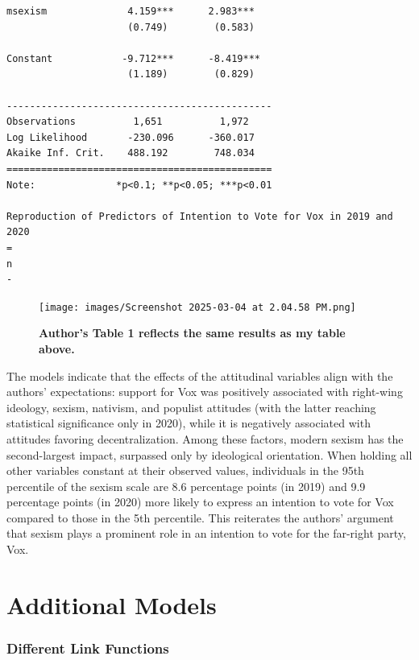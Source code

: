 \documentclass[
  letterpaper,
  DIV=11,
  numbers=noendperiod]{scrartcl}
\begin{document}
\begin{verbatim}
msexism              4.159***      2.983***   
                     (0.749)        (0.583)   
                                              
Constant            -9.712***      -8.419***  
                     (1.189)        (0.829)   
                                              
----------------------------------------------
Observations          1,651          1,972    
Log Likelihood       -230.096      -360.017   
Akaike Inf. Crit.    488.192        748.034   
==============================================
Note:              *p<0.1; **p<0.05; ***p<0.01

Reproduction of Predictors of Intention to Vote for Vox in 2019 and 2020
=
n
-
\end{verbatim}

\begin{figure}[H]

{\centering \texttt{[image: images/Screenshot 2025-03-04 at 2.04.58 PM.png]}

}

\caption{\textbf{Author's Table 1 reflects the same results as my table
above.}}

\end{figure}%

The models indicate that the effects of the attitudinal variables align
with the authors' expectations: support for Vox was positively
associated with right-wing ideology, sexism, nativism, and populist
attitudes (with the latter reaching statistical significance only in
2020), while it is negatively associated with attitudes favoring
decentralization. Among these factors, modern sexism has the
second-largest impact, surpassed only by ideological orientation. When
holding all other variables constant at their observed values,
individuals in the 95th percentile of the sexism scale are 8.6
percentage points (in 2019) and 9.9 percentage points (in 2020) more
likely to express an intention to vote for Vox compared to those in the
5th percentile. This reiterates the authors' argument that sexism plays
a prominent role in an intention to vote for the far-right party, Vox.

\section{Additional Models}\label{additional-models}

\subsubsection{Different Link Functions}\label{different-link-functions}
\end{document}
